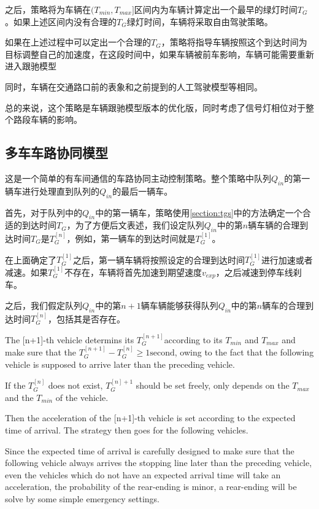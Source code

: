 \documentclass[a4paper,UTF8]{paper}
\begin{document}
之后，策略将为车辆在$(T_{min},T_{max}]$区间内为车辆计算定出一个最早的绿灯时间$T_G$。如果上述区间内没有合理的$T_G$绿灯时间，车辆将采取自由驾驶策略。

如果在上述过程中可以定出一个合理的$T_G$，策略将指导车辆按照这个到达时间为目标调整自己的加速度，在这段时间中，如果车辆被前车影响，车辆可能需要重新进入跟驰模型

同时，车辆在交通路口前的表象和之前提到的人工驾驶模型等相同。

总的来说，这个策略是车辆跟驰模型版本的优化版，同时考虑了信号灯相位对于整个路段车辆的影响。

\subsection{多车车路协同模型}
\label{section:st2}
这是一个简单的有车间通信的车路协同主动控制策略。整个策略中队列$Q_{in}$的第一辆车进行处理直到队列的$Q_{in}$的最后一辆车。

首先，对于队列中的$Q_{in}$中的第一辆车，策略使用\ref{section:tgs}中的方法确定一个合适的到达时间$T_G$，为了方便后文表述，我们设定队列$Q_{in}$中的第$n$辆车辆的合理到达时间$T_G$是$T_G^{[n]}$，例如，第一辆车的到达时间就是$T_G^{[1]}$。

在上面确定了$T_G^{[1]}$之后，第一辆车辆将按照设定的合理到达时间$T_G^{[1]}$进行加速或者减速。如果$T_G^{[1]}$不存在，车辆将首先加速到期望速度$v_{exp}$，之后减速到停车线刹车。

之后，我们假定队列$Q_{in}$中的第$n+1$辆车辆能够获得队列$Q_{in}$中的第$n$辆车的合理到达时间$T_G^{[n]}$，包括其是否存在。

The [n+1]-th vehicle determins its $T_G^{[n+1]}$according to its $T_{min}$ and $T_{max}$ and make sure that the $T_G^{[n+1]}-T_G^{[n]} \ge 1 \mathrm{second}$, owing to the fact that the following vehicle is supposed to arrive later than the preceding vehicle.

If the $T_G^{[n]}$ does not exist, $T_G^{[n]+1}$ should be set freely, only depends on the $T_{max}$ and the $T_{min}$ of the vehicle.

Then the acceleration of the [n+1]-th vehicle is set according to the expected time of arrival. The strategy then goes for the following vehicles.

Since the expected time of arrival is carefully designed to make sure that the following vehicle always arrives the stopping line later than the preceding vehicle, even the vehicles which do not have an expected arrival time will take an acceleration, the probability of the rear-ending is minor, a rear-ending will be solve by some simple emergency settings. 
\end{document}
